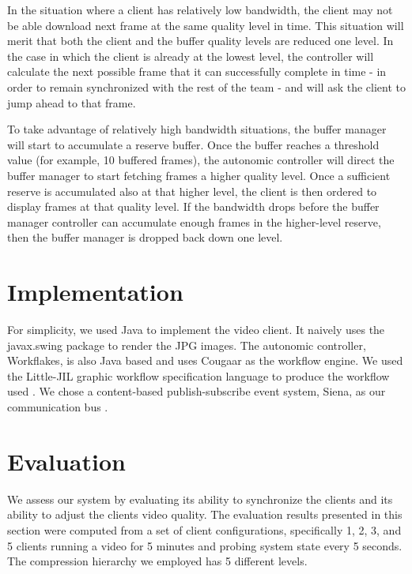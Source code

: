 \documentclass{sig-alternate}
\begin{document}
In the situation where a client has relatively low bandwidth, the
client may not be able download next frame at the same quality level
in time.  This situation will merit that both the client and the
buffer quality levels are reduced one level. In the case in which the
client is already at the lowest level, the controller will calculate
the next possible frame that it can successfully complete in time - in
order to remain synchronized with the rest of the team - and will ask
the client to jump ahead to that frame.

To take advantage of relatively high bandwidth situations, the buffer
manager will start to accumulate a reserve buffer.  Once the buffer
reaches a threshold value (for example, 10 buffered frames), the
autonomic controller will direct the buffer manager to start fetching
frames a higher quality level.  Once a sufficient reserve is
accumulated also at that higher level, the client is then ordered to
display frames at that quality level.  If the bandwidth drops before
the buffer manager controller can accumulate enough frames in the
higher-level reserve, then the buffer manager is dropped back down one
level.

\section{Implementation} \label{implementation}

For simplicity, we used Java to implement the video client.  It
naively uses the javax.swing package to render the JPG images.  The
autonomic controller, Workflakes, is also Java based and uses Cougaar
\cite{COUGAAR} as the workflow engine.  We used the Little-JIL graphic
workflow specification language to produce the workflow used
\cite{LJIL}.  We chose a content-based publish-subscribe event
system, Siena, as our communication bus \cite{SIENA}.

\section{Evaluation} \label{eval}

We assess our system by evaluating its ability to synchronize the
clients and its ability to adjust the clients video quality.  The
evaluation results presented in this section were computed from a set
of client configurations, specifically 1, 2, 3, and 5 clients running
a video for 5 minutes and probing system state every 5 seconds. The
compression hierarchy we employed has 5 different levels.
\end{document}
